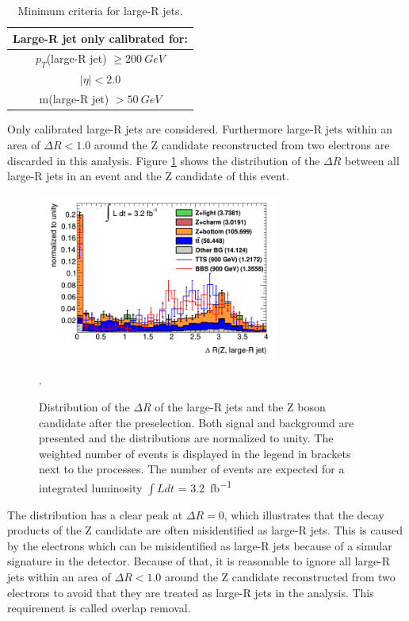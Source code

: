 \begin{table}[h!]
\centering
\setlength{\tabcolsep}{3cm}
\begin{tabular}{|c|} 
\hline
\textbf{Large-R jet only calibrated for:}\\
\hline
\hline
$p_{T}$(large-R jet) $\geq \SI{200}{GeV}$\\
$\mid \eta \mid < 2.0$ \\
m(large-R jet) $> \SI{50}{GeV}$\\
\hline
\end{tabular}
\caption{Minimum criteria for large-R jets.}
\label{calibration}
\end{table}

Only calibrated large-R jets are considered.
Furthermore large-R jets within an area of $\Delta R < 1.0$ around the Z candidate reconstructed from two electrons are discarded in this analysis.
Figure \ref{deltaR} shows the distribution of the $\Delta R$ between all large-R jets in an event and the Z candidate of this event.

\begin{figure}
\centering
\includegraphics[width=8cm]{figures/deltaR.png}
\caption{Distribution of the $\Delta R$ of the large-R jets and the Z boson candidate after the preselection. 
Both signal and background are presented and the distributions are normalized to unity. 
The weighted number of events is displayed in the legend in brackets next to the processes. 
The number of events are expected for a integrated luminosity $\int L dt$ = \SI{3.2}{fb^{-1}}}.
\label{deltaR}
\end{figure}

The distribution has a clear peak at $\Delta R = 0$, which illustrates that the decay products of the Z candidate are often misidentified as large-R jets.
This is caused by the electrons which can be misidentified as large-R jets because of a simular signature in the detector.
Because of that, it is reasonable to ignore all large-R jets within an area of $\Delta R < 1.0$ around the Z candidate reconstructed from two electrons to avoid that they are treated as large-R jets in the analysis.
This requirement is called overlap removal.



